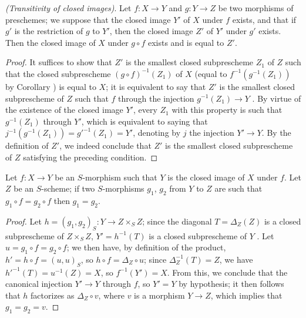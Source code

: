 \begin{prop}[9.5.5]
\label{1.9.5.5}
\emph{(Transitivity of closed images)}. Let $f:X\to Y$ and $g:Y\to Z$ be two morphisms of
preschemes; we suppose that the closed image $Y'$ of $X$ under $f$ exists, and that if $g'$
is the restriction of $g$ to $Y'$, then the closed image $Z'$ of $Y'$ under $g'$ exists. Then
the closed image of $X$ under $g\circ f$ exists and is equal to $Z'$.
\end{prop}

\begin{proof}
\label{proof-1.9.5.5}
It suffices  to show that $Z'$ is the smallest closed
subprescheme $Z_1$ of $Z$ such that the closed subprescheme $(g\circ f)^{-1}(Z_1)$ of $X$
(equal to $f^{-1}(g^{-1}(Z_1))$ by Corollary ) is equal to
$X$; it is equivalent to say that $Z'$ is the smallest closed subprescheme of $Z$ such that
$f$  through the injection $g^{-1}(Z_1)\to Y$ . By
virtue of the existence of the closed image $Y'$, every $Z_1$ with this property is such
that $g^{-1}(Z_1)$  through $Y'$, which is equivalent to saying that $j^{-1}(g^{-1}(Z_1))=g'^{-1}(Z_1)=Y'$, denoting by $j$ the injection $Y'\to Y$.
By the definition of $Z'$, we indeed conclude that $Z'$ is the smallest closed
subprescheme of $Z$ satisfying the preceding condition.
\end{proof}

\begin{cor}[9.5.6]
\label{1.9.5.6}
Let $f:X\to Y$ be an $S$-morphism such that $Y$ is the closed image of $X$ under $f$.
Let $Z$ be an $S$-scheme; if two $S$-morphisms $g_1$, $g_2$ from $Y$ to $Z$ are such that $g_1\circ f=g_2\circ f$ then $g_1=g_2$.
\end{cor}

\begin{proof}
\label{proof-1.9.5.6}
Let $h=(g_1,g_2)_S:Y\to Z\times_S Z$; since the diagonal $T=\Delta_Z(Z)$ is a closed subprescheme of $Z\times_S Z$, $Y'=h^{-1}(T)$ is a closed subprescheme of $Y$ .
Let $u=g_1\circ f=g_2\circ f$; we then have, by definition of the product, $h'=h\circ f=(u,u)_S$, so $h\circ f=\Delta_Z\circ u$; since $\Delta_Z^{-1}(T)=Z$, we have $h'^{-1}(T)=u^{-1}(Z)=X$, so $f^{-1}(Y')=X$.
From this, we conclude  that the canonical injection $Y'\to Y$  through $f$, so $Y'=Y$ by hypothesis; it then follows  that $h$ factorizes as $\Delta_Z\circ v$, where $v$ is a morphism $Y\to Z$, which implies that $g_1=g_2=v$.
\end{proof}

